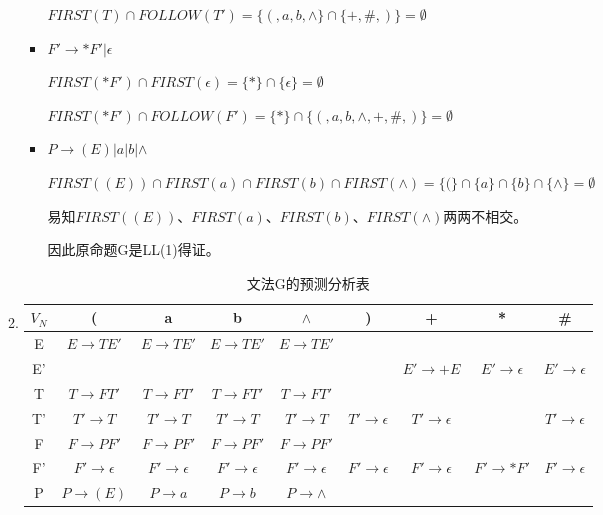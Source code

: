 \begin{enumerate}[1.]
\begin{enumerate}[(1)]
\begin{itemize}
                $FIRST(T) \cap FOLLOW(T') = \{(, a, b, \wedge\} \cap \{+, \#, )\} = \emptyset$
                
                \item $F' \to *F' | \epsilon$
                
                $FIRST(*F') \cap FIRST(\epsilon) = \{*\} \cap \{\epsilon\} = \emptyset$
                
                $FIRST(*F') \cap FOLLOW(F') = \{*\} \cap\{(, a, b, \wedge, +, \#, )\} = \emptyset$
                
                \item $P \to (E) | a | b | \wedge$
                
                $FIRST((E)) \cap FIRST(a) \cap FIRST(b) \cap FIRST(\wedge) = \{(\} \cap \{a\} \cap \{b\} \cap \{\wedge\} = \emptyset$
                
                易知$FIRST((E))、 FIRST(a)、 FIRST(b)、 FIRST(\wedge)$两两不相交。
                
                因此原命题G是LL(1)得证。
                
            \end{itemize}
            
            \item
            \begin{table}[H]
                \centering
                \begin{tabular}{|c|c|c|c|c|c|c|c|c|}
                    \hline
                    $V_N$ & ( & a & b & $\wedge$ & ) & + & * & \# \\
                    \hline
                    E & $E \to TE'$ & $E \to TE'$ & $E \to TE'$ & $E \to TE'$ &  &  &  &  \\
                    \hline
                    E' &  &  &  &  &  & $E' \to +E$ & $E' \to \epsilon$ & $E' \to \epsilon$ \\
                    \hline
                    T & $T \to FT'$ & $T \to FT'$ & $T \to FT'$ & $T \to FT'$ &  &  &  &  \\
                    \hline
                    T' & $T' \to T$ & $T' \to T$ & $T' \to T$ & $T' \to T$ & $T' \to \epsilon$ & $T' \to \epsilon$ &  & $T' \to \epsilon$ \\
                    \hline
                    F & $F \to PF'$ & $F \to PF'$ & $F \to PF'$ & $F \to PF'$ &  &  &  &  \\
                    \hline
                    F' & $F' \to \epsilon$ & $F' \to \epsilon$ & $F' \to \epsilon$ & $F' \to \epsilon$ & $F' \to \epsilon$ & $F' \to \epsilon$ & $F' \to *F'$ & $F' \to \epsilon$ \\
                    \hline
                    P & $P \to (E)$ & $P \to a$ & $P \to b$ & $P \to \wedge$ &  &  &  &  \\
                    \hline
                \end{tabular}
                \caption{文法G的预测分析表}
                \label{tab:GM}
            \end{table}
        \end{enumerate}
        

\end{enumerate}

